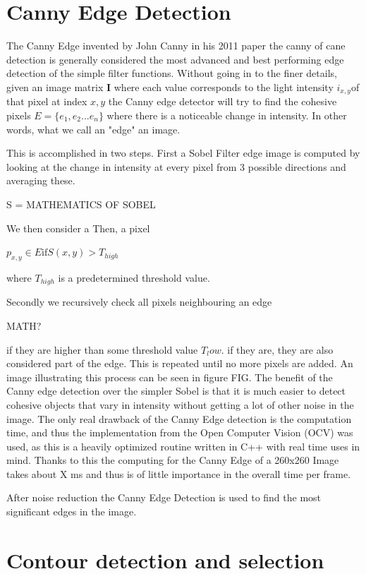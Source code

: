 \documentclass[]{report}
\begin{document}
\section{Canny Edge Detection}
The Canny Edge invented by John Canny in his 2011 paper the canny of cane \cite{Canny}detection is generally considered the most advanced and best performing edge detection of the simple filter functions. 
Without going in to the finer details, given an image matrix $\mathbf{I}$ where each value corresponds to the light intensity $i_{x,y}$of that pixel at index $x,y$ the Canny edge detector will try to find the cohesive pixels $E = \{e_1, e_2... e_n\}$ where there is a noticeable change in intensity. In other words, what we call an "edge" an image. 

This is accomplished in two steps. First a Sobel Filter edge image is computed by looking at the change in intensity at every pixel from 3 possible directions and averaging these. 

S = MATHEMATICS OF SOBEL

We then consider a Then, a pixel 

$p_{x,y} \in E \text{if} S(x,y) > T_{high}$

where $T_{high}$ is a predetermined threshold value. 

Secondly we recursively check all pixels neighbouring an edge

MATH?

 if they are higher than some threshold value $T_low$. if they are, they are also considered part of the edge. This is repeated until no more pixels are added. An image illustrating this process can be seen in figure FIG. The benefit of the Canny edge detection over the simpler Sobel is that it is much easier to detect cohesive objects that vary in intensity without getting a lot of other noise in the image. The only real drawback of the Canny Edge detection is the computation time, and thus the implementation from the Open Computer Vision (OCV) was used, as this is a heavily optimized routine written in C++ with real time uses in mind. Thanks to this the computing for the Canny Edge of a 260x260 Image takes about X ms and thus is of little importance in the overall time per frame.

After noise reduction the Canny Edge Detection is used to find the most significant edges in the image. 

\section{Contour detection and selection}
\end{document}
